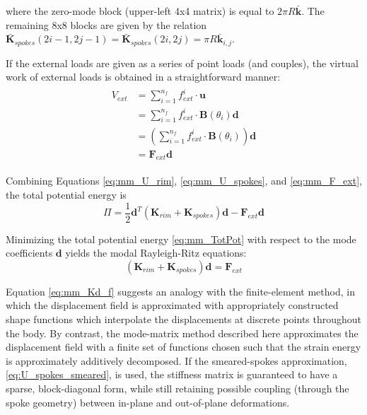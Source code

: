\documentclass[\rootdir/thesis.tex]{subfiles}
\begin{document}
where the zero-mode block (upper-left 4x4 matrix) is equal to $2\pi R\mathbf{\bar{k}}$. The remaining 8x8 blocks are given by the relation $\mathbf{\bar{K}}_{spokes}(2i-1, 2j-1) = \mathbf{\bar{K}}_{spokes}(2i, 2j) = \pi R \mathbf{\bar{k}}_{i,j}$.

If the external loads are given as a series of point loads (and couples), the virtual work of external loads is obtained in a straightforward manner:
\begin{align}
\label{eq:mm_F_ext}
\begin{split}
V_{ext} &= \sum_{i=1}^{n_f} f_{ext}^i \cdot \mathbf{u} \\
&= \sum_{i=1}^{n_f} f_{ext}^i \cdot \mathbf{B}(\theta_i)\mathbf{d}\\
&= \left(\sum_{i=1}^{n_f} f_{ext}^i \cdot \mathbf{B}(\theta_i) \right) \mathbf{d}\\
&= \mathbf{F}_{ext}\mathbf{d}
\end{split}
\end{align}

Combining Equations \eqref{eq:mm_U_rim}, \eqref{eq:mm_U_spokes}, and \eqref{eq:mm_F_ext}, the total potential energy is
\begin{equation}
\label{eq:mm_TotPot}
\Pi = \frac{1}{2} \mathbf{d}^T \left( \mathbf{K}_{rim} + \mathbf{K}_{spokes} \right) \mathbf{d} - \mathbf{F}_{ext}\mathbf{d}
\end{equation}

Minimizing the total potential energy \eqref{eq:mm_TotPot} with respect to the mode coefficients $\mathbf{d}$ yields the modal Rayleigh-Ritz equations:
\begin{equation}
\label{eq:mm_Kd_f}
\left( \mathbf{K}_{rim} + \mathbf{K}_{spokes} \right) \mathbf{d} = \mathbf{F}_{ext}
\end{equation}

Equation \eqref{eq:mm_Kd_f} suggests an analogy with the finite-element method, in which the displacement field is approximated with appropriately constructed shape functions which interpolate the displacements at discrete points throughout the body. By contrast, the mode-matrix method described here approximates the displacement field with a finite set of functions chosen such that the strain energy is approximately additively decomposed. If the smeared-spokes approximation, \eqref{eq:U_spokes_smeared}, is used, the stiffness matrix is guaranteed to have a sparse, block-diagonal form, while still retaining possible coupling (through the spoke geometry) between in-plane and out-of-plane deformations.
\end{document}
